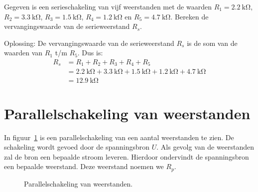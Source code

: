 \begin{example}
Gegeven is een serieschakeling van vijf weerstanden met de waarden $R_1=\SI{2.2}{\kilo\ohm}$,
$R_2=\SI{3.3}{\kilo\ohm}$, $R_3=\SI{1.5}{\kilo\ohm}$, $R_4=\SI{1.2}{\kilo\ohm}$ en
$R_5=\SI{4.7}{\kilo\ohm}$. Bereken de vervangingswaarde van de serieweerstand $R_s$.

Oplossing: De vervangingswaarde van de serieweerstand $R_s$ is de som van de waarden van $R_1$
t/m $R_5$. Dus is:
\begin{equation}
\begin{split}
R_s &= R_1 + R_2 + R_3 + R_4 + R_5\\
    &= \SI{2.2}{\kilo\ohm} + \SI{3.3}{\kilo\ohm} +
        \SI{1.5}{\kilo\ohm} + \SI{1.2}{\kilo\ohm} + \SI{4.7}{\kilo\ohm} \\
    &= \SI{12.9}{\kilo\ohm} 
\end{split}
\end{equation}
\end{example}

\section{Parallelschakeling van weerstanden}
In figuur~\ref{fig:gelparalledschakelingweerstanden} is een parallelschakeling van een
aantal weerstanden te zien. De schakeling wordt gevoed door de spanningsbron $U$. Als
gevolg van de weerstanden zal de bron een bepaalde stroom leveren. Hierdoor ondervindt
de spanningsbron een bepaalde weerstand. Deze weerstand noemen we $R_p$.

\begin{figure}[!ht]
\centering
{}
\caption{Parallelschakeling van weerstanden.}
\label{fig:gelparalledschakelingweerstanden}
\end{figure}


